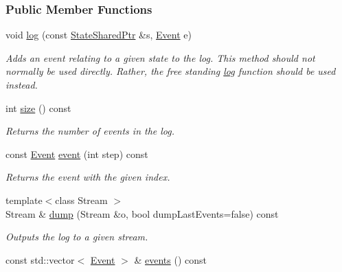 \subsubsection*{Public Member Functions}
\begin{DoxyCompactItemize}
\item 
void \hyperlink{structslb_1_1core_1_1ui_1_1AlgorithmLog_aeedd840e2ae69d8e581b55f4fa36268a}{log} (const \hyperlink{structslb_1_1core_1_1ui_1_1AlgorithmLog_acb46cb3c44c97ddbb219e4c0120e87e3}{State\+Shared\+Ptr} \&s, \hyperlink{structslb_1_1core_1_1ui_1_1AlgorithmLog_aa495893d6c587c69280c82dd4f1684ff}{Event} e)
\begin{DoxyCompactList}\small\item\em Adds an event relating to a given state to the log. This method should not normally be used directly. Rather, the free standing \hyperlink{structslb_1_1core_1_1ui_1_1AlgorithmLog_aeedd840e2ae69d8e581b55f4fa36268a}{log} function should be used instead. \end{DoxyCompactList}\item 
int \hyperlink{structslb_1_1core_1_1ui_1_1AlgorithmLog_ae250b96f0a4c6c4aa9147485dea7b5c9}{size} () const 
\begin{DoxyCompactList}\small\item\em Returns the number of events in the log. \end{DoxyCompactList}\item 
const \hyperlink{structslb_1_1core_1_1ui_1_1AlgorithmLog_aa495893d6c587c69280c82dd4f1684ff}{Event} \hyperlink{structslb_1_1core_1_1ui_1_1AlgorithmLog_a625a45a73af1aad6f8146fa507cb0d63}{event} (int step) const 
\begin{DoxyCompactList}\small\item\em Returns the event with the given index. \end{DoxyCompactList}\item 
{\footnotesize template$<$class Stream $>$ }\\Stream \& \hyperlink{structslb_1_1core_1_1ui_1_1AlgorithmLog_ab9aff9f9e9298bc4cff5ecd7fd47c7c4}{dump} (Stream \&o, bool dump\+Last\+Events=false) const 
\begin{DoxyCompactList}\small\item\em Outputs the log to a given stream. \end{DoxyCompactList}\item 
const std\+::vector$<$ \hyperlink{structslb_1_1core_1_1ui_1_1AlgorithmLog_aa495893d6c587c69280c82dd4f1684ff}{Event} $>$ \& \hyperlink{structslb_1_1core_1_1ui_1_1AlgorithmLog_a55ddcad6e4ed11440752d025f2212650}{events} () const 

\end{DoxyCompactItemize}
